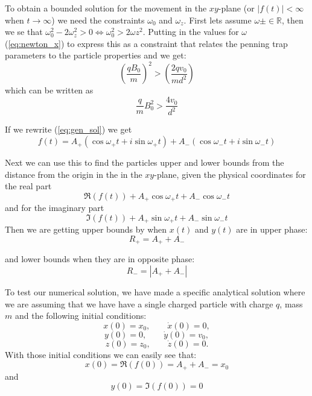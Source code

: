\documentclass[english,notitlepage,reprint,nofootinbib]{revtex4-1}  %
\begin{document}
	To obtain a bounded solution for the movement in the $xy$-plane (or $|f(t)| < \infty$ when $t\to\infty$) we need the constraints $\omega_0$ and $\omega_z$. First lets assume $\omega \pm \in \mathbb{R}$, then we se that
	$\omega_0^2 - 2 \omega_z^2 > 0 \Leftrightarrow \omega_0^2 > 2 \omega z^2$.
	Putting in the values for $\omega$ (\ref{eq:newton_x}) to express this as a constraint that relates the penning trap parameters to the particle properties and we get:
	\begin{equation*}
		\left( \frac{q B_0}{m} \right) ^2 > \left( \frac{2 q v_0}{m d^2} \right)
	\end{equation*}
	which can be written as
	\begin{equation*}
		\frac{q}{m} B_0^2 > \frac{4 v_0}{d^2} 
	\end{equation*}

    If we rewrite (\ref{eq:gen_sol}) we get
    \begin{equation*}
        f(t) = A_+ (\cos \omega_+ t + i \sin \omega_+ t) + A_- (\cos \omega_- t + i \sin \omega_- t)
    \end{equation*}

    Next we can use this to find the particles upper and lower bounds from the distance from the origin in the in the $xy$-plane, given the physical coordinates for the real part
	\begin{equation*} 
		\Re \left( f(t) \right) + A_+ \cos \omega_+ t + A_- \cos \omega_- t
	\end{equation*}
	and for the imaginary part
	\begin{equation*}
		\Im \left( f(t) \right) + A_+ \sin \omega_+ t + A_- \sin \omega_- t
	\end{equation*}
	Then we are getting upper bounds by when $x(t)$ and $y(t)$ are in upper phase:
	\begin{equation*}
		R_+ = A_+ + A_-
	\end{equation*}

	and lower bounds when they are in opposite phase:
	\begin{equation*}
		R_- = | A_+ + A_- |
	\end{equation*}

	To test our numerical solution, we have made a specific analytical solution where we are assuming that we have have a single charged particle with charge $q$, mass $m$ and the following initial conditions:
	$$ x(0) = x_0, \qquad \dot{x}(0) = 0, $$
	$$ y(0) = 0, \qquad \dot{y}(0) = v_0, $$
	$$ z(0) = z_0, \qquad \dot{z}(0) = 0. $$
	With those initial conditions we can easily see that:
	\begin{equation*}
		x(0) = \Re \left( f(0) \right) = A_+ + A_- = x_0
	\end{equation*}
	and
	\begin{equation*}
		y(0) = \Im \left( f(0) \right) = 0
	\end{equation*}
\end{document}
